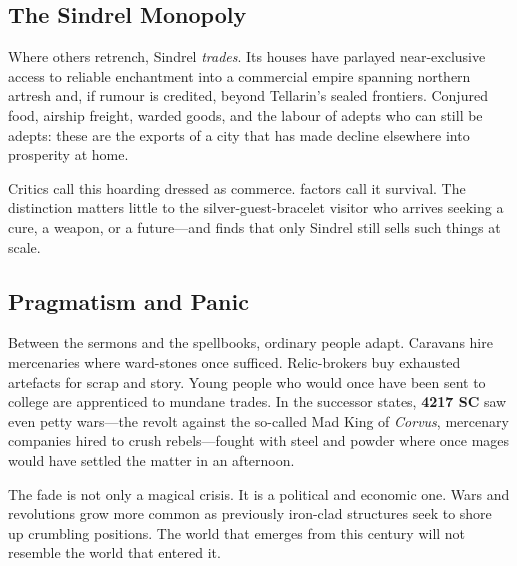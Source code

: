 \subsection{The Sindrel Monopoly}

Where others retrench, Sindrel \emph{trades}. Its houses have parlayed near-exclusive access to reliable enchantment into a commercial empire spanning northern \gls{artresh} and, if rumour is credited, beyond Tellarin's sealed frontiers. Conjured food, airship freight, warded goods, and the labour of adepts who can still be adepts: these are the exports of a city that has made decline elsewhere into prosperity at home.

Critics call this hoarding dressed as commerce. \Glspl{factor} call it survival. The distinction matters little to the \gls{silver-guest-bracelet} visitor who arrives seeking a cure, a weapon, or a future---and finds that only Sindrel still sells such things at scale.

\subsection{Pragmatism and Panic}

Between the sermons and the spellbooks, ordinary people adapt. Caravans hire mercenaries where ward-stones once sufficed. Relic-brokers buy exhausted artefacts for scrap and story. Young people who would once have been sent to college are apprenticed to mundane trades. In the successor states, \textbf{4217 SC} saw even petty wars---the revolt against the so-called Mad King of \emph{Corvus}, mercenary companies hired to crush rebels---fought with steel and powder where once mages would have settled the matter in an afternoon.

The fade is not only a magical crisis. It is a political and economic one. Wars and revolutions grow more common as previously iron-clad structures seek to shore up crumbling positions. The world that emerges from this century will not resemble the world that entered it.

\begin{DndTimeline}
\end{DndTimeline}
